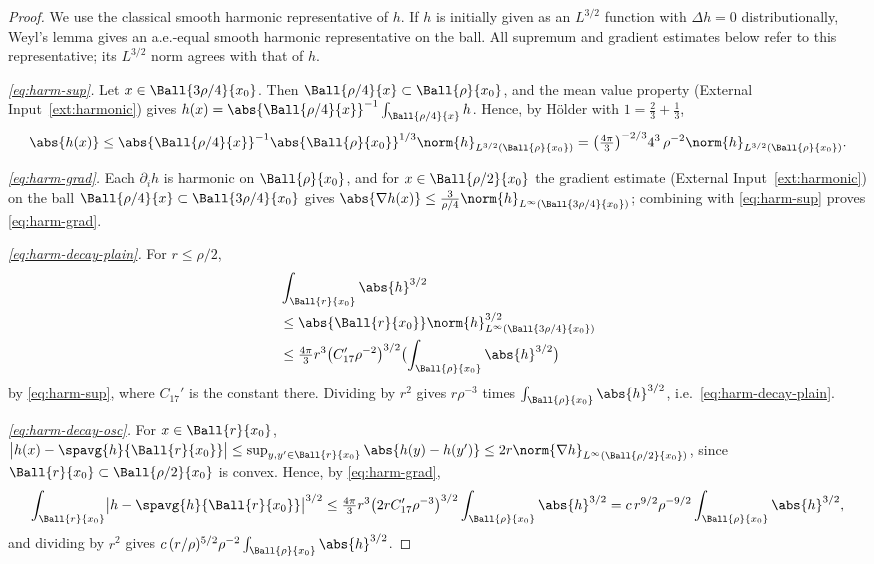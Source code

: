 \documentclass[11pt,reqno]{amsart}
\begin{document}
\begin{proof}
We use the classical smooth harmonic representative of $h$.
If $h$ is initially given as an $L^{3/2}$ function with $\Delta h=0$
distributionally, Weyl's lemma gives an a.e.-equal smooth harmonic
representative on the ball. All supremum and gradient estimates below
refer to this representative; its $L^{3/2}$ norm agrees with that of $h$.

\emph{\eqref{eq:harm-sup}.} Let $x\in\Ball{3\rho/4}{x_{0}}$. Then
$\Ball{\rho/4}{x}\subset\Ball{\rho}{x_{0}}$, and the mean value property
(External Input~\ref{ext:harmonic}) gives
$h(x)=\abs{\Ball{\rho/4}{x}}^{-1}\int_{\Ball{\rho/4}{x}}h$. Hence, by H\"older
with $1=\tfrac23+\tfrac13$,
\[
  \abs{h(x)}\le\abs{\Ball{\rho/4}{x}}^{-1}\abs{\Ball{\rho}{x_{0}}}^{1/3}
     \norm{h}_{L^{3/2}(\Ball{\rho}{x_{0}})}
  =\bigl(\tfrac{4\pi}{3}\bigr)^{-2/3}4^{3}\,\rho^{-2}
     \norm{h}_{L^{3/2}(\Ball{\rho}{x_{0}})} .
\]

\emph{\eqref{eq:harm-grad}.} Each $\partial_{i}h$ is harmonic on
$\Ball{\rho}{x_{0}}$, and for $x\in\Ball{\rho/2}{x_{0}}$ the gradient estimate
(External Input~\ref{ext:harmonic}) on the ball $\Ball{\rho/4}{x}\subset
\Ball{3\rho/4}{x_{0}}$ gives
$\abs{\nabla h(x)}\le\tfrac{3}{\rho/4}\norm{h}_{L^{\infty}(\Ball{3\rho/4}{x_{0}})}$;
combining with \eqref{eq:harm-sup} proves \eqref{eq:harm-grad}.

\emph{\eqref{eq:harm-decay-plain}.} For $r\le\rho/2$,
\[
\begin{aligned}
&\int_{\Ball{r}{x_{0}}}\abs{h}^{3/2}
\\ &\le\abs{\Ball{r}{x_{0}}}
 \norm{h}_{L^{\infty}(\Ball{3\rho/4}{x_{0}})}^{3/2}
\\ &\le\tfrac{4\pi}{3}r^{3}\bigl(C_{17}'\rho^{-2}\bigr)^{3/2}
 \bigl(\int_{\Ball{\rho}{x_{0}}}\abs{h}^{3/2}\bigr)
\end{aligned}
\]
 by \eqref{eq:harm-sup},
where $C_{17}'$ is the constant there. Dividing by $r^{2}$ gives
$r\rho^{-3}$ times $\int_{\Ball{\rho}{x_{0}}}\abs{h}^{3/2}$, i.e.\
\eqref{eq:harm-decay-plain}.

\emph{\eqref{eq:harm-decay-osc}.} For $x\in\Ball{r}{x_{0}}$,
$\bigl|h(x)-\spavg{h}{\Ball{r}{x_{0}}}\bigr|
 \le\sup_{y,y'\in\Ball{r}{x_{0}}}\abs{h(y)-h(y')}
 \le2r\norm{\nabla h}_{L^{\infty}(\Ball{\rho/2}{x_{0}})}$, since
$\Ball{r}{x_{0}}\subset\Ball{\rho/2}{x_{0}}$ is convex. Hence, by
\eqref{eq:harm-grad},
\[
  \int_{\Ball{r}{x_{0}}}\bigl|h-\spavg{h}{\Ball{r}{x_{0}}}\bigr|^{3/2}
  \le\tfrac{4\pi}{3}r^{3}\bigl(2rC_{17}'\rho^{-3}\bigr)^{3/2}
     \int_{\Ball{\rho}{x_{0}}}\abs{h}^{3/2}
  = c\,r^{9/2}\rho^{-9/2}\int_{\Ball{\rho}{x_{0}}}\abs{h}^{3/2},
\]
and dividing by $r^{2}$ gives $c\,(r/\rho)^{5/2}\rho^{-2}
\int_{\Ball{\rho}{x_{0}}}\abs{h}^{3/2}$.
\end{proof}
\end{document}
